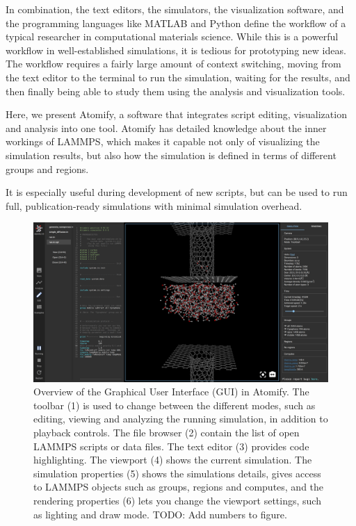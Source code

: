 \documentclass[aps,pre,twocolumn,letterpaper,floatfix,nofootinbib]{revtex4}
\begin{document}
In combination, the text editors, the simulators, the visualization software, and the programming
languages like MATLAB and Python define the workflow of a typical researcher in computational
materials science.
While this is a powerful workflow in well-established simulations,
it is tedious for prototyping new ideas.
The workflow requires a fairly large amount of context switching,
moving from the text editor to the terminal to run the simulation,
waiting for the results, and then finally being able to study them using the analysis
and visualization tools.

Here, we present Atomify, a software that integrates script editing,
visualization and analysis into one tool.
Atomify has detailed knowledge about the inner workings of LAMMPS,
which makes it capable not only of visualizing the simulation results,
but also how the simulation is defined in terms of different groups and regions.

It is especially useful during development of new scripts, but can be used
to run full, publication-ready simulations with minimal simulation overhead.

\begin{figure}
	\centering
	\includegraphics[width=\textwidth]{gui.png}
	\caption{%
    Overview of the Graphical User Interface (GUI) in Atomify.
    The toolbar (1) is used to change between the different modes, such as
    editing, viewing and analyzing the running simulation,
    in addition to playback controls.
    The file browser (2) contain the list of open LAMMPS scripts or data files.
    The text editor (3) provides code highlighting.
    The viewport (4) shows the current simulation.
    The simulation properties (5) shows the simulations details, gives access to
    LAMMPS objects such as groups, regions and computes, and the rendering
    properties (6) lets you change the viewport settings, such as lighting and
    draw mode.
    TODO: Add numbers to figure.
    }
	\label{fig:gui}
\end{figure}
\end{document}
